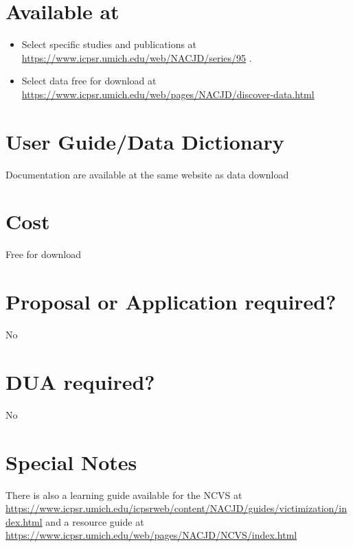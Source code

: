 \documentclass[
]{book}
\providecommand{\tightlist}{%
  \setlength{\itemsep}{0pt}\setlength{\parskip}{0pt}}
\begin{document}
\hypertarget{available-at-46}{%
\section{Available at}\label{available-at-46}}

\begin{itemize}
\tightlist
\item
  Select specific studies and publications at \url{https://www.icpsr.umich.edu/web/NACJD/series/95} .
\item
  Select data free for download at \url{https://www.icpsr.umich.edu/web/pages/NACJD/discover-data.html}
\end{itemize}

\hypertarget{user-guidedata-dictionary-46}{%
\section{User Guide/Data Dictionary}\label{user-guidedata-dictionary-46}}

Documentation are available at the same website as data download

\hypertarget{cost-46}{%
\section{Cost}\label{cost-46}}

Free for download

\hypertarget{proposal-or-application-required-46}{%
\section{Proposal or Application required?}\label{proposal-or-application-required-46}}

No

\hypertarget{dua-required-46}{%
\section{DUA required?}\label{dua-required-46}}

No

\hypertarget{special-notes-46}{%
\section{Special Notes}\label{special-notes-46}}

There is also a learning guide available for the NCVS at \url{https://www.icpsr.umich.edu/icpsrweb/content/NACJD/guides/victimization/index.html} and a resource guide at \url{https://www.icpsr.umich.edu/web/pages/NACJD/NCVS/index.html}
\end{document}
